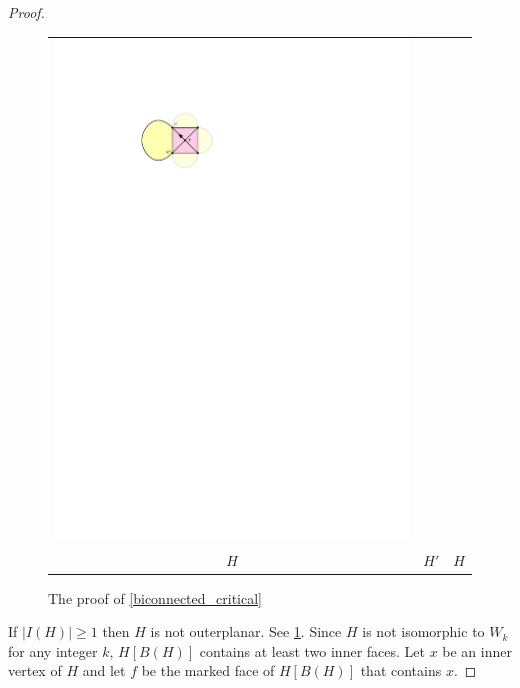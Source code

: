 \documentclass{article}
\theoremstyle{definition}
\begin{document}
\begin{proof}
\begin{figure}
\begin{tabular}{ccc}
      \includegraphics[page=3]{figs/biconnected} \\
      $H$ & $H'$ & $H$
    \end{tabular}
    \caption{The proof of \cref{biconnected_critical}}
    \label{contraction_proof}
  \end{figure}
  If $|I(H)|\ge 1$ then $H$ is not outerplanar.  See \cref{contraction_proof}.  Since $H$ is not isomorphic to $W_k$ for any integer $k$, $H[B(H)]$ contains at least two inner faces.  Let $x$ be an inner vertex of $H$ and let $f$ be the marked face of $H[B(H)]$ that contains $x$.

\end{proof}
\end{document}
